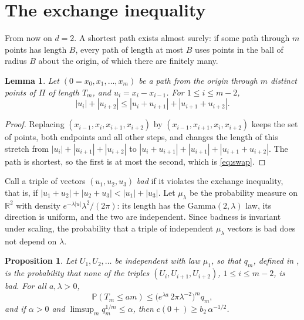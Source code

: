 \documentclass[11pt]{article}
\newtheorem{lemma}[theorem]{Lemma}
\newtheorem{proposition}[theorem]{Proposition}
\theoremstyle{remark}
\newcommand{\R}{\mathbb{R}}
\newcommand{\Prob}{\mathbb{P}}
\begin{document}
\section{The exchange inequality}\label{sec:exchange}

From now on $d=2$. A shortest path exists almost surely: if some path through $m$ points has length $B$, every path
of length at most $B$ uses points in the ball of radius $B$ about the origin, of which there are finitely many.

\begin{lemma}\label{lem:swap}
Let $(0=x_0,x_1,\dots,x_m)$ be a path from the origin through $m$ distinct points of $\Pi$ of length $T_m$, and
$u_i=x_i-x_{i-1}$. For $1\le i\le m-2$,
\begin{equation}\label{eq:swap}
|u_i|+|u_{i+2}|\le|u_i+u_{i+1}|+|u_{i+1}+u_{i+2}|.
\end{equation}
\end{lemma}

\begin{proof}
Replacing $(x_{i-1},x_i,x_{i+1},x_{i+2})$ by $(x_{i-1},x_{i+1},x_i,x_{i+2})$ keeps the set of points, both endpoints and
all other steps, and changes the length of this stretch from $|u_i|+|u_{i+1}|+|u_{i+2}|$ to
$|u_i+u_{i+1}|+|u_{i+1}|+|u_{i+1}+u_{i+2}|$. The path is shortest, so the first is at most the second, which is
\eqref{eq:swap}.
\end{proof}

Call a triple of vectors $(u_1,u_2,u_3)$ \emph{bad} if it violates the exchange inequality, that is, if
$|u_1+u_2|+|u_2+u_3|<|u_1|+|u_3|$. Let $\mu_\lambda$ be the probability measure
on $\R^2$ with density $e^{-\lambda|u|}\lambda^2/(2\pi)$: its length has the Gamma$(2,\lambda)$ law, its direction
is uniform, and the two are independent. Since badness is invariant under scaling, the probability that a triple of
independent $\mu_\lambda$ vectors is bad does not depend on $\lambda$.

\begin{proposition}\label{prop:block}
Let $U_1,U_2,\dots$ be independent with law $\mu_1$, so that $q_m$, defined in , is the probability
that none of the triples $(U_i,U_{i+1},U_{i+2})$, $1\le i\le m-2$, is bad. For all $a,\lambda>0$,
\[
\Prob(T_m\le am)\le\bigl(e^{\lambda a}\,2\pi\lambda^{-2}\bigr)^m q_m ,
\]
and if $\alpha>0$ and $\limsup_m q_m^{1/m}\le\alpha$, then $c(0+)\ge b_2\,\alpha^{-1/2}$.
\end{proposition}
\end{document}
